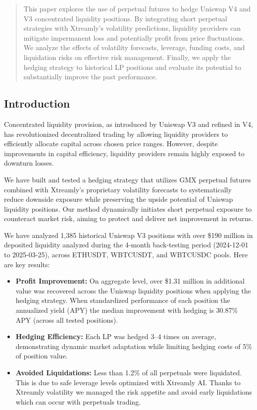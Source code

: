 \documentclass[10pt]{article}
\begin{document}
\begin{abstract}
	This paper explores the use of perpetual futures to hedge Uniswap V4 and V3 concentrated liquidity positions. By integrating short perpetual strategies with Xtreamly’s volatility predictions, liquidity providers can mitigate impermanent loss and potentially profit from price fluctuations. We analyze the effects of volatility forecasts, leverage, funding costs, and liquidation risks on effective risk management. Finally, we apply the hedging strategy to historical LP positions and evaluate its potential to substantially improve the past performance.
\end{abstract}
\medskip
\begin{multicols}{2}


\section{Introduction}
\label{sec:introduction}

Concentrated liquidity provision, as introduced by Uniswap V3 and refined in V4, has revolutionized decentralized trading by allowing liquidity providers to efficiently allocate capital across chosen price ranges. However, despite improvements in capital efficiency, liquidity providers remain highly exposed to downturn losses.

\smallskip
We have built and tested a hedging strategy that utilizes GMX perpetual futures combined with Xtreamly’s proprietary volatility forecasts to systematically reduce downside exposure while preserving the upside potential of Uniswap liquidity positions. Our method dynamically initiates short perpetual exposure to counteract market risk, aiming to protect and deliver net improvement in returns.

\smallskip
We have analyzed 1,385 historical Uniswap V3 positions with over \$190 million in deposited liquidity analyzed during the 4-month back-testing period (2024-12-01 to 2025-03-25), across ETHUSDT, WBTCUSDT, and WBTCUSDC pools. Here are key results:

\begin{itemize}
	\item \textbf{Profit Improvement:} On aggregate level, over \$1.31 million in additional value was recovered across the Uniswap liquidity positions when applying the hedging strategy. When standardized performance of each position the annualized yield (APY) the median improvement with hedging is 30.87\% APY (across all tested positions).
	\item \textbf{Hedging Efficiency:} Each LP was hedged 3–4 times on average, demonstrating dynamic market adaptation while limiting hedging costs of 5\% of position value.
	\item \textbf{Avoided Liquidations:} Less than 1.2\% of all perpetuals were liquidated. This is due to safe leverage levels optimized with Xtreamly AI. Thanks to Xtreamly volatility we managed the risk appetite and avoid early liquidations which can occur with perpetuals trading.
\end{itemize}


\end{multicols}
\end{document}
